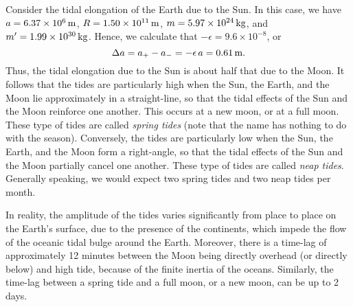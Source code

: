 Consider the tidal elongation of the Earth due to the Sun. In this case, 
we have $a=6.37\times 10^6\,{\rm m}$, $R=1.50\times 10^{11}\,{\rm m}$, 
$m=5.97\times 10^{24}\,{\rm kg}$, and $m'=1.99\times 10^{30}\,{\rm kg}$. 
Hence, we calculate that $-\epsilon=9.6\times 10^{-8}$, or
\begin{equation}
\Delta a = a_+-a_- = -\epsilon\,a = 0.61\,{\rm m}.
\end{equation}
Thus, the tidal elongation due to the Sun is about half that due to the Moon.
It follows that the tides are particularly high when the Sun, the Earth, and
the Moon lie  approximately in a straight-line, so that the tidal effects of the Sun and the Moon reinforce one another. This occurs at a new moon,
or at a full moon. These type of tides are called {\em spring tides} (note that
the name has nothing to do with the season). Conversely, the
tides are particularly low when the Sun, the Earth, and the Moon
form a right-angle, so that the tidal effects of the
Sun and the Moon partially cancel one another. These type of tides are called {\em neap tides}. Generally
speaking, we would expect two spring tides and two neap tides per month.

In reality, the amplitude of the tides varies significantly from place to place on the Earth's surface, due to the presence of the continents, which impede the flow of the oceanic tidal bulge
around the Earth. Moreover, there is a time-lag of approximately 12 minutes
between the Moon being directly overhead (or directly below) and
high tide, because of the finite inertia of the oceans. Similarly, the time-lag
between a spring tide and a full moon, or a new moon, can be up to 2 days.

